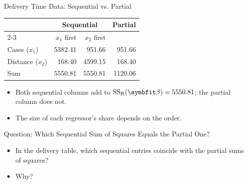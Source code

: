 \begin{frame}{Delivery Time Data: Sequential vs. Partial}
    \begin{center}
        \small
        \begin{tabular}{lrrr}
            \toprule
            & \multicolumn{2}{c}{Sequential} & Partial \\
            \cmidrule(lr){2-3}
            & $x_1$ first & $x_2$ first & \\
            \midrule
            Cases ($x_1$) & 5382.41 & 951.66 & 951.66 \\
            Distance ($x_2$) & 168.40 & 4599.15 & 168.40 \\
            \midrule
            Sum & 5550.81 & 5550.81 & 1120.06 \\
            \bottomrule
        \end{tabular}
    \end{center}
    \begin{itemize}
        \item Both sequential columns add to $\SSR(\bbeta)=5550.81$; the partial column does not.
        \item The size of each regressor's share depends on the order.
    \end{itemize}
\end{frame}


\begin{frame}{Question: Which Sequential Sum of Squares Equals the Partial One?}
    \begin{itemize}
        \item In the delivery table, which sequential entries coincide with the partial sums of squares?
        \item Why?
    \end{itemize}
\end{frame}


